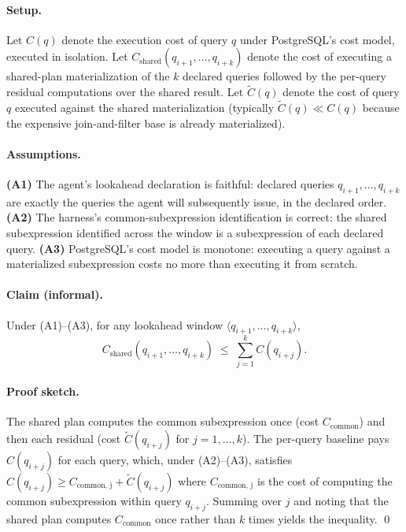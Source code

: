 \paragraph{Setup.}
Let $C(q)$ denote the execution cost of query $q$ under PostgreSQL's cost model, executed in isolation. Let $C_{\text{shared}}(q_{i+1}, \ldots, q_{i+k})$ denote the cost of executing a shared-plan materialization of the $k$ declared queries followed by the per-query residual computations over the shared result. Let $\tilde{C}(q)$ denote the cost of query $q$ executed against the shared materialization (typically $\tilde{C}(q) \ll C(q)$ because the expensive join-and-filter base is already materialized).

\paragraph{Assumptions.}
\textbf{(A1)} The agent's lookahead declaration is faithful: declared queries $q_{i+1}, \ldots, q_{i+k}$ are exactly the queries the agent will subsequently issue, in the declared order.
\textbf{(A2)} The harness's common-subexpression identification is correct: the shared subexpression identified across the window is a subexpression of each declared query.
\textbf{(A3)} PostgreSQL's cost model is monotone: executing a query against a materialized subexpression costs no more than executing it from scratch.

\paragraph{Claim (informal).}
Under (A1)--(A3), for any lookahead window $\langle q_{i+1}, \ldots, q_{i+k}\rangle$,
\[
C_{\text{shared}}(q_{i+1}, \ldots, q_{i+k}) \;\leq\; \sum_{j=1}^{k} C(q_{i+j}).
\]

\paragraph{Proof sketch.}
The shared plan computes the common subexpression once (cost $C_{\text{common}}$) and then each residual (cost $\tilde{C}(q_{i+j})$ for $j = 1, \ldots, k$). The per-query baseline pays $C(q_{i+j})$ for each query, which, under (A2)--(A3), satisfies $C(q_{i+j}) \geq C_{\text{common, j}} + \tilde{C}(q_{i+j})$ where $C_{\text{common, j}}$ is the cost of computing the common subexpression within query $q_{i+j}$. Summing over $j$ and noting that the shared plan computes $C_{\text{common}}$ once rather than $k$ times yields the inequality.
\qed

